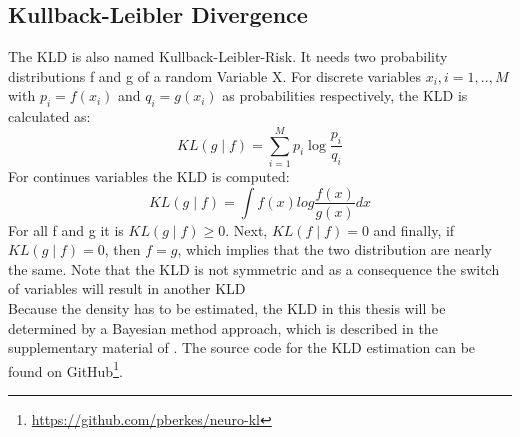 \subsection{Kullback-Leibler Divergence}\label{TlSubSecKLD}
The \acl{KLD} is also named Kullback-Leibler-Risk.
It needs two probability distributions f and g of a random Variable X.
For discrete variables $x_i, i=1,..,M$ with $p_i=f(x_i)$ and $q_i=g(x_i)$ as probabilities respectively, the \acs{KLD} is calculated as:\cite[p.5-7]{Commenges.}
\begin{equation}
KL(g\mid f) = \sum_{i=1}^{M}p_i\log\frac{p_i}{q_i}
\end{equation} 
For continues variables the \ac{KLD} is computed:
\begin{equation}
KL(g\mid f) = \int f(x)log\frac{f(x)}{g(x)} dx
\end{equation}
For all f and g it is $KL(g\mid f) \ge 0$. Next, $KL(f\mid f) = 0$ and finally, if $KL(g\mid f) = 0$, then $f = g$, which implies that the two distribution are nearly the same.
Note that the \acs{KLD} is not symmetric and as a consequence the  switch of variables will result in another \acs{KLD}\cite[p.5-7]{Commenges.}\\
Because the density has to be estimated, the \acs{KLD} in this thesis will be determined by a Bayesian method approach, which is described in the supplementary material of \cite{Berkes.2011}.
The source code for the \acs{KLD} estimation can be found on GitHub\footnote{\url{https://github.com/pberkes/neuro-kl}}.

